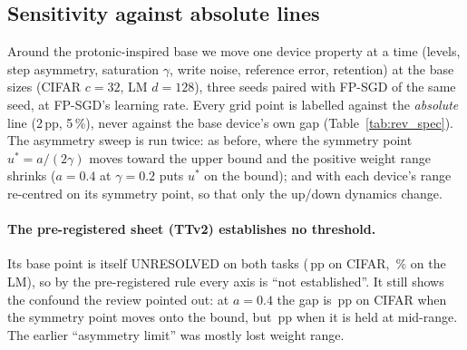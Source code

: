 \subsection{Sensitivity against absolute lines}\label{sec:spec}
Around the protonic-inspired base we move one device property at a time (levels, step asymmetry, saturation $\gamma$, write
noise, reference error, retention) at the base sizes (CIFAR $c=32$, LM $d=128$), three seeds paired with FP-SGD of the same seed,
at FP-SGD's learning rate. Every grid point is labelled against the \emph{absolute} line (2\,pp, 5\,\%), never against the base
device's own gap (Table~\ref{tab:rev_spec}). The asymmetry sweep is run twice: as before, where the symmetry point
$u^*=a/(2\gamma)$ moves toward the upper bound and the positive weight range shrinks ($a=0.4$ at $\gamma=0.2$ puts $u^*$ on the
bound); and with each device's range re-centred on its symmetry point, so that only the up/down dynamics change.

\paragraph{The pre-registered sheet (TTv2) establishes no threshold.} Its base point is itself UNRESOLVED on both tasks
(\RVSpecTtvTwoCifarBaseGap\,pp on CIFAR, \RVSpecTtvTwoLmBaseGap\,\% on the LM), so by the pre-registered rule every axis is ``not
established''. It still shows the confound the review pointed out: at $a=0.4$ the gap is \RVSpecTtvTwoCifarAsymAtZeroPFourGap\,pp
on CIFAR when the symmetry point moves onto the bound, but \RVSpecTtvTwoCifarAsymFixedspAtZeroPFourGap\,pp when it is held at
mid-range. The earlier ``asymmetry limit'' was mostly lost weight range.

